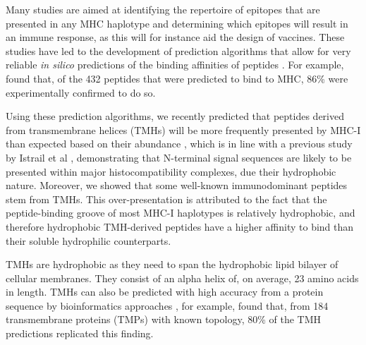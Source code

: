 
Many studies are aimed at identifying the repertoire of epitopes that are presented in any MHC haplotype and determining which epitopes will result in an immune response, 
as this will for instance aid the design of vaccines. 
These studies have led to the development of prediction algorithms 
that allow for very reliable \emph{in silico} predictions 
of the binding affinities of peptides
\cite{larsen2010identification,schellens2008unanticipated,tang2011genome}.
For example, \cite{tang2011genome} found that, 
of the 432 peptides that were predicted to bind to MHC,
86\% were experimentally confirmed to do so. 


Using these prediction algorithms, 
we recently predicted that peptides derived 
from transmembrane helices (TMHs) 
will be more frequently presented by MHC-I 
than expected based on their abundance \cite{bianchi2017},
which is in line with a previous study 
by Istrail et al \cite{istrail2004comparative},
demonstrating that N-terminal signal sequences 
are likely to be presented within major histocompatibility complexes, 
due their hydrophobic nature. 
Moreover, we showed that some well-known immunodominant peptides stem from TMHs. 
This over-presentation is attributed to the fact 
that the peptide-binding groove of most MHC-I haplotypes 
is relatively hydrophobic, 
and therefore hydrophobic TMH-derived peptides have a higher affinity 
to bind than their soluble hydrophilic counterparts. 

TMHs are hydrophobic 
as they need to span the hydrophobic lipid bilayer of cellular membranes.
They consist of an alpha helix of, on average, 23 amino acids in length. 
TMHs can also be predicted with high accuracy from a protein sequence 
by bioinformatics approaches \cite{krogh2001predicting,kall2004combined,arai2004conpred,jones2007improving,klammer2009metatm,wang2019efficient},
for example, \cite{jones2007improving} found that,
from 184 transmembrane proteins (TMPs) with known topology, 
80\% of the TMH predictions replicated this finding.
 
